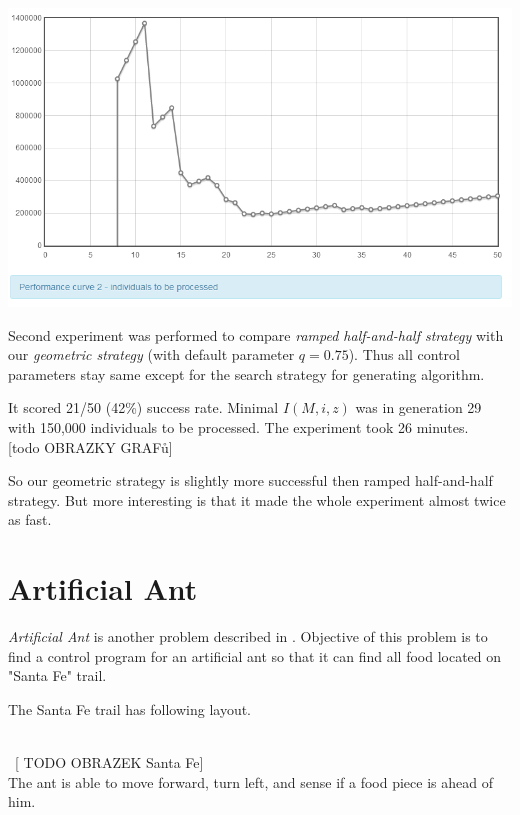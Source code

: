 \documentclass[12pt,a4paper]{report}
\begin{document}
\includegraphics[scale=0.65]{reports/SSR/1/indivs.png}

Second experiment was performed to compare 
\textit{ramped half-and-half strategy} with our
\textit{geometric strategy} (with default parameter $q=0.75$). 
Thus all control parameters stay same except for the 
search strategy for generating algorithm.

It scored 21/50 (42\%) success rate. 
Minimal $I(M,i,z)$ was in generation 29 
with 150,000 individuals to be processed.
The experiment took 26 minutes.\\

[todo OBRAZKY GRAFů]

So our geometric strategy is slightly more successful then 
ramped half-and-half strategy. But more interesting is that
it made the whole experiment almost twice as fast.



\section{Artificial Ant}

\textit{Artificial Ant} is another problem described
in \cite{koza92}. Objective of this problem is to 
find a control program for an artificial ant so
that it can find all food located on "Santa Fe" trail.

The Santa Fe trail has following layout.

~\\~[ TODO OBRAZEK Santa Fe]\\



The ant is able to move forward, turn left, and sense if a food 
piece is ahead of him.\\
\end{document}

